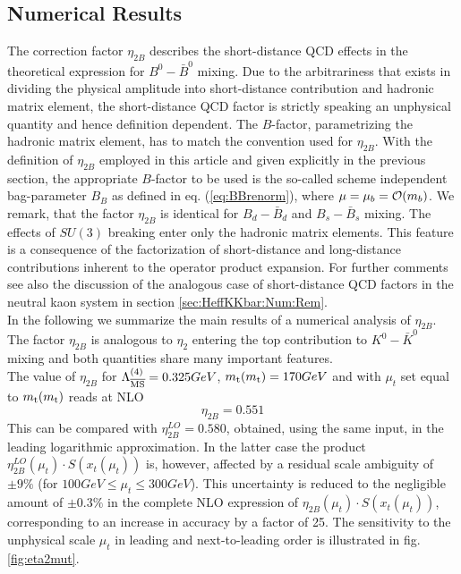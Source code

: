 \subsection{Numerical Results}
\label{sec:HeffBBbar:Num}
The correction factor $\eta_{2B}$ describes the short-distance
QCD effects in the theoretical expression for $B^0-\bar B^0$
mixing.
Due to the arbitrariness that exists in dividing
the physical amplitude into short-distance contribution and
hadronic matrix element, the short-distance QCD factor is strictly
speaking an unphysical quantity and hence definition dependent.
The $B$-factor, parametrizing the hadronic matrix element, has to
match the convention used for $\eta_{2B}$. With the definition of
$\eta_{2B}$ employed in this article and given explicitly in the previous
section, the appropriate $B$-factor to be used is the so-called
scheme independent bag-parameter $B_B$ as defined in eq.
(\ref{eq:BBrenorm}), where $\mu=\mu_b={\cal O}(m_b)$.
We remark, that the factor $\eta_{2B}$ is identical for
$B_d-\bar B_d$ and $B_s-\bar B_s$ mixing. The effects of $SU(3)$
breaking enter only the hadronic matrix elements. This feature
is a consequence of the factorization of short-distance and
long-distance contributions inherent to the operator product expansion.
For further
comments see also the discussion of the analogous case of
short-distance QCD factors in the neutral kaon system in section
\ref{sec:HeffKKbar:Num:Rem}.
\\
In the following we summarize the main results of a numerical analysis
of $\eta_{2B}$. The factor $\eta_{2B}$ is analogous to $\eta_2$
entering the top contribution to $K^0-\bar K^0$ mixing and both
quantities share many important features.
\\
The value of $\eta_{2B}$ for
$\Lambda_{\overline{\rm MS}}^{(4)}=0.325 GeV$, $m_{\rm t}(m_{\rm t})=170 GeV$ and
with $\mu_t$ set equal to $m_{\rm t}(m_{\rm t})$ reads at NLO
\begin{equation}\label{eta2bnum}
\eta_{2B}=0.551
\end{equation}
This can be compared with $\eta^{LO}_{2B}=0.580$, obtained, using
the same input, in the leading logarithmic approximation.
In the latter case the product
$\eta^{LO}_{2B}(\mu_t)\cdot S(x_t(\mu_t))$ is, however, affected
by a residual scale ambiguity of $\pm 9\%$ (for
$100 GeV\leq\mu_t\leq 300 GeV$). This uncertainty is reduced to the
negligible amount of $\pm 0.3\%$ in the complete NLO expression of
$\eta_{2B}(\mu_t)\cdot S(x_t(\mu_t))$, corresponding to an increase
in accuracy by a factor of 25. The sensitivity to the unphysical
scale $\mu_t$ in leading and next-to-leading order is illustrated
in fig. \ref{fig:eta2mut}.

